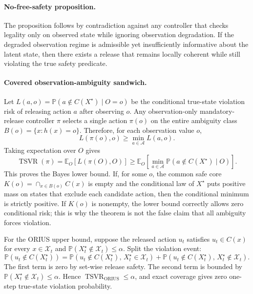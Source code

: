 \paragraph{No-free-safety proposition.}
The proposition follows by contradiction against any controller that checks legality only on
observed state while ignoring observation degradation. If the degraded observation regime is
admissible yet insufficiently informative about the latent state, then there exists a
release that remains locally coherent while still violating the true safety predicate.

\paragraph{Covered observation-ambiguity sandwich.}
Let $L(a,o)=\mathbb{P}(a\notin C(X^\star)\mid O=o)$ be the conditional
true-state violation risk of releasing action $a$ after observing $o$.  Any
observation-only mandatory-release controller $\pi$ selects a single action
$\pi(o)$ on the entire ambiguity class $B(o)=\{x:h(x)=o\}$.  Therefore, for
each observation value $o$,
\[
  L(\pi(o),o)\ge \min_{a\in\mathcal{A}} L(a,o).
\]
Taking expectation over $O$ gives
\[
  \operatorname{TSVR}(\pi)
  = \mathbb{E}_{O}\!\left[L(\pi(O),O)\right]
  \ge
  \mathbb{E}_{O}\!\left[
    \min_{a\in\mathcal{A}}
    \mathbb{P}(a\notin C(X^\star)\mid O)
  \right].
\]
This proves the Bayes lower bound.  If, for some $o$, the common safe core
$K(o)=\cap_{x\in B(o)}C(x)$ is empty and the conditional law of $X^\star$ puts
positive mass on states that exclude each candidate action, then the conditional
minimum is strictly positive.  If $K(o)$ is nonempty, the lower bound correctly
allows zero conditional risk; this is why the theorem is not the false claim
that all ambiguity forces violation.

For the ORIUS upper bound, suppose the released action $u_t$ satisfies
$u_t\in C(x)$ for every $x\in\mathcal{X}_t$ and
$\mathbb{P}(X_t^\star\notin\mathcal{X}_t)\le\alpha$.  Split the violation event:
\[
  \mathbb{P}(u_t\notin C(X_t^\star))
  =
  \mathbb{P}(u_t\notin C(X_t^\star),\, X_t^\star\in\mathcal{X}_t)
  +
  \mathbb{P}(u_t\notin C(X_t^\star),\, X_t^\star\notin\mathcal{X}_t).
\]
The first term is zero by set-wise release safety.  The second term is bounded
by $\mathbb{P}(X_t^\star\notin\mathcal{X}_t)\le\alpha$.  Hence
$\operatorname{TSVR}_{\mathrm{ORIUS}}\le\alpha$, and exact coverage gives zero
one-step true-state violation probability.

